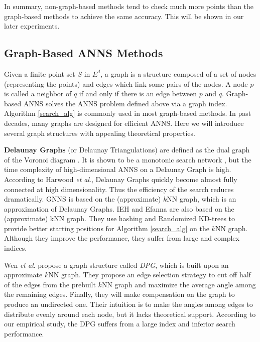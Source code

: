\documentclass{vldb}
\def\etal{\emph{et al}.}
\begin{document}
In summary, non-graph-based methods tend to check much more points than the graph-based methods to achieve the same accuracy. This will be shown in our later experiments. 

\subsection{Graph-Based ANNS Methods}
Given a finite point set $S$ in $E^d$, a graph is a structure composed of a set of nodes (representing the points) and edges which link some pairs of the nodes. A node $p$ is called a neighbor of $q$ if and only if there is an edge between $p$ and $q$. Graph-based ANNS solves the ANNS problem defined above via a graph index. Algorithm \ref{search_alg} is commonly used in most graph-based methods. In past decades, many graphs are designed for efficient ANNS. Here we will introduce several graph structures with appealing theoretical properties.

\textbf{Delaunay Graphs} (or Delaunay Triangulations) are defined as the dual graph of the Voronoi diagram \cite{aurenhammer1991voronoi}. It is shown to be a monotonic search network \cite{kurup1992database}, but the time complexity of high-dimensional ANNS on a Delaunay Graph is high. According to Harwood \etal \cite{Ben2016Fanng}, Delaunay Graphs quickly become almost fully connected at high dimensionality. Thus the efficiency of the search reduces dramatically. GNNS \cite{Hajebi2011Fast} is based on the (approximate) $k$NN graph, which is an approximation of Delaunay Graphs. IEH \cite{Jin2014Fast} and Efanna \cite{CongEfanna2016} are also based on the (approximate) kNN graph. They use hashing and Randomized KD-trees to provide better starting positions for Algorithm \ref{search_alg} on the $k$NN graph. Although they improve the performance, they suffer from large and complex indices. 

Wen \etal \cite{li2016approximate} propose a graph structure called \textit{DPG}, which is built upon an approximate $k$NN graph. They propose an edge selection strategy to cut off half of the edges from the prebuilt $k$NN graph and maximize the average angle among the remaining edges. Finally, they will make compensation on the graph to produce an undirected one. Their intuition is to make the angles among edges to distribute evenly around each node, but it lacks theoretical support. According to our empirical study, the DPG suffers from a large index and inferior search performance. 
\end{document}
